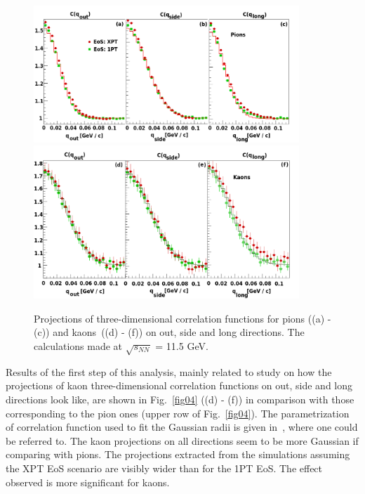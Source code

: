 \documentclass[a4paper]{panl}
\begin{document}
 \begin{figure}[t]
    \begin{center}
      \includegraphics[width=100mm]{fig4a.png}
      \includegraphics[width=100mm]{fig4b.png}
      \vspace{-3mm}
      \caption{Projections of three-dimensional correlation functions for pions ((a) - (c)) and \newline kaons~((d) - (f)) on out, side and long directions.
      The calculations made at $\sqrt{s_{NN}}$ = 11.5 GeV.}
    \end{center}
    \vspace{-5mm}
  \end{figure}

 Results of the first step of this analysis, mainly related to study on how the projections of kaon three-dimensional correlation functions on out, side and long directions look like,
 are shown in Fig.~\ref{fig04} ((d) - (f)) in comparison with those corresponding to the pion ones (upper row of Fig.~\ref{fig04}). The parametrization of correlation function used to fit
 the Gaussian radii is given in~\cite{Batyuk:2017smw}, where one could be referred to.
 The kaon projections on all directions seem to be more Gaussian if comparing with pions. The projections extracted from the simulations assuming the XPT EoS scenario are visibly wider than
 for the 1PT EoS. The effect observed is more significant for kaons.   
\end{document}
